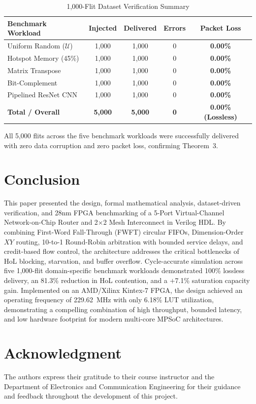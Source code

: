 \documentclass[conference]{IEEEtran}
\begin{document}
\begin{table}[htbp]
\caption{1,000-Flit Dataset Verification Summary}
\label{tab:dset_summary}
\centering
\begin{tabular}{lcccc}
\toprule
\textbf{Benchmark Workload} & \textbf{Injected} & \textbf{Delivered} & \textbf{Errors} & \textbf{Packet Loss} \\
\midrule
Uniform Random ($\mathcal{U}$) & 1,000 & 1,000 & 0 & \textbf{0.00\%} \\
Hotspot Memory (45\%) & 1,000 & 1,000 & 0 & \textbf{0.00\%} \\
Matrix Transpose & 1,000 & 1,000 & 0 & \textbf{0.00\%} \\
Bit-Complement & 1,000 & 1,000 & 0 & \textbf{0.00\%} \\
Pipelined ResNet CNN & 1,000 & 1,000 & 0 & \textbf{0.00\%} \\
\midrule
\textbf{Total / Overall} & \textbf{5,000} & \textbf{5,000} & \textbf{0} & \textbf{0.00\% (Lossless)} \\
\bottomrule
\end{tabular}
\end{table}

All 5,000 flits across the five benchmark workloads were successfully delivered with zero data corruption and zero packet loss, confirming Theorem~3.

\section{Conclusion}
\label{sec:conclusion}
This paper presented the design, formal mathematical analysis, dataset-driven verification, and 28nm FPGA benchmarking of a 5-Port Virtual-Channel Network-on-Chip Router and 2$\times$2 Mesh Interconnect in Verilog HDL. By combining First-Word Fall-Through (FWFT) circular FIFOs, Dimension-Order $XY$ routing, 10-to-1 Round-Robin arbitration with bounded service delays, and credit-based flow control, the architecture addresses the critical bottlenecks of HoL blocking, starvation, and buffer overflow. Cycle-accurate simulation across five 1,000-flit domain-specific benchmark workloads demonstrated 100\% lossless delivery, an 81.3\% reduction in HoL contention, and a $+$7.1\% saturation capacity gain. Implemented on an AMD/Xilinx Kintex-7 FPGA, the design achieved an operating frequency of 229.62~MHz with only 6.18\% LUT utilization, demonstrating a compelling combination of high throughput, bounded latency, and low hardware footprint for modern multi-core MPSoC architectures.

\section*{Acknowledgment}
The authors express their gratitude to their course instructor and the Department of Electronics and Communication Engineering for their guidance and feedback throughout the development of this project.



\end{document}
